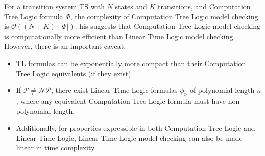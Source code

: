 \noindent For a transition system $\text{TS}$ with $N$ states and $K$ transitions, and Computation Tree Logic formula $\Phi$, the complexity of Computation Tree Logic model checking is $\mathcal{O}((N+K)\cdot\left\lvert \Phi\right\rvert )$.
his suggests that Computation Tree Logic model checking is computationally more efficient than Linear Time Logic model checking.
However, there is an important caveat:
\begin{itemize}
    \item TL formulas can be exponentially more compact than their Computation Tree Logic equivalents (if they exist).
    \item If $\mathcal{P}\neq\mathcal{NP}$, there exist Linear Time Logic formulas $\phi_n$ of polynomial length $n$, where any equivalent Computation Tree Logic formula must have non-polynomial length.
    \item Additionally, for properties expressible in both Computation Tree Logic and Linear Time Logic, Linear Time Logic model checking can also be made linear in time complexity.
\end{itemize}